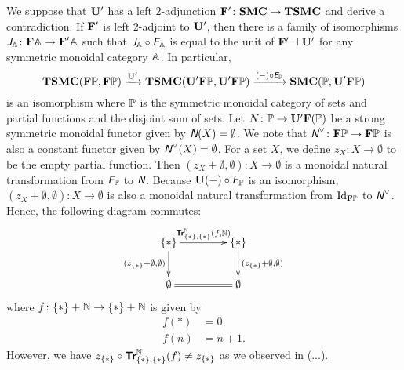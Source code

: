We suppose that $\mathbf{U}'$ has a left $2$-adjunction $\mathbf{F}' \colon \mathbf{SMC}
\to \mathbf{TSMC}$ and derive a contradiction. If $\mathbf{F}'$ is left
$2$-adjoint to $\mathbf{U}'$, then there is a family of isomorphisms
$\textit{\textsf{J}}_{\mathbb{A}} \colon \mathbf{F}\mathbb{A} \to \mathbf{F}'\mathbb{A}$ such that
$\textit{\textsf{J}}_{\mathbb{A}} \circ \textit{\textsf{E}}_{\mathbb{A}}$ is equal to the unit
of $\mathbf{F}' \dashv \mathbf{U}'$ for any symmetric monoidal category
$\mathbb{A}$. In particular,
\begin{equation*}
  \mathbf{TSMC}(\mathbf{F}\mathbb{P},\mathbf{F}\mathbb{P}) \xrightarrow{\mathbf{U}'}
  \mathbf{TSMC}(\mathbf{U}'\mathbf{F}\mathbb{P},\mathbf{U}'\mathbf{F}\mathbb{P}) \xrightarrow{(-) \circ \textit{\textsf{E}}_{\mathbb{\mathbb{P}}}}
  \mathbf{SMC}(\mathbb{P},\mathbf{U}'\mathbf{F}\mathbb{P})
\end{equation*}
is an isomorphism where $\mathbb{P}$ is the symmetric monoidal category of
sets and partial functions and the disjoint sum of sets. Let $N
\colon \mathbb{P} \to \mathbf{U}'\mathbf{F}(\mathbb{P})$ be a strong symmetric monoidal functor
given by $\textit{\textsf{N}}(X) = \emptyset$. We note that $\textit{\textsf{N}}^{\vee} \colon \mathbf{F}\mathbb{P}
\to \mathbf{F}\mathbb{P}$ is also a constant functor given by $\textit{\textsf{N}}^{\vee}(X) =
\emptyset$. For a set $X$, we define $z_{X} \colon X \to
\emptyset$ to be the empty partial function. Then $(z_{X} +
\emptyset,\emptyset) \colon X \to \emptyset$ is a monoidal natural
transformation from $\textit{\textsf{E}}_{\mathbb{\mathbb{P}}}$ to $\textit{\textsf{N}}$. Because $\mathbf{U}(-) \circ
\textit{\textsf{E}}_{\mathbb{\mathbb{P}}}$ is an isomorphism, $(z_{X} + \emptyset,\emptyset)
\colon X \to \emptyset$ is also a monoidal natural transformation
from $\mbox{Id}_{\mathbf{F}\mathbb{P}}$ to $\textit{\textsf{N}}^{\vee}$. Hence, the following diagram
commutes:
\begin{equation*}
  \xymatrix@C=15mm{
    \{\ast\} \ar[r]^{\Tr{\NN}_{\{\ast\},\{\ast\}}(f,\NN)}
    \ar[d]_{(z_{\{\ast\}} + \emptyset,\emptyset)} &
    \{\ast\} \ar[d]^{(z_{\{\ast\}} + \emptyset,\emptyset)} \\
    \emptyset \ar@{=}[r] &
    \emptyset
  }
\end{equation*}
where $f \colon \{\ast\} + \mathbb N \to \{\ast\} + \mathbb N$ is given by
\begin{align*}
  f(\ast) &= 0, \\
  f(n) &= n+1.
\end{align*}
However, we have $z_{\{\ast\}} \circ {\normalfont\textsf{\textbf{Tr}}}^{\mathbb N}_{\{\ast\},\{\ast\}}(f) \neq z_{\{\ast\}}$
as we observed in (...).
